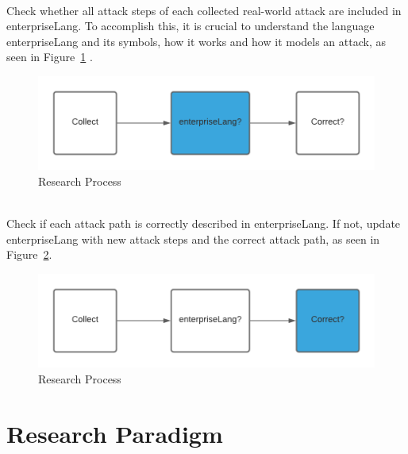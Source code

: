 \documentclass[english]{kththesis}
\begin{document}
\\

\noindent Check whether all attack steps of each collected real-world attack are included in enterpriseLang. To accomplish this, it is crucial to understand the language enterpriseLang and its symbols, how it works and how it models an attack, as seen in Figure~\ref{fig:researchsteps2} \cite{xiong2021cyber,johnson2018mal}.

\begin{figure}[!ht]
  \begin{center}
    \includegraphics{researchsteps2.png}
  \end{center}
  \caption{Research Process}
  \label{fig:researchsteps2}
\end{figure}

\\

\noindent Check if each attack path is correctly described in enterpriseLang. If not, update enterpriseLang with new attack steps and the correct attack path, as seen in Figure~\ref{fig:researchsteps3}.

\begin{figure}[!ht]
  \begin{center}
    \includegraphics{researchsteps3.png}
  \end{center}
  \caption{Research Process}
  \label{fig:researchsteps3}
\end{figure}

\newpage
\section{Research Paradigm}
\label{sec:researchParadigm}
\end{document}
